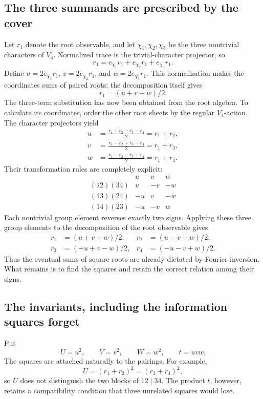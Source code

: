 \documentclass[11pt]{article}
\theoremstyle{remark}
\begin{document}
\subsection{The three summands are prescribed by the cover}

Let \(r_1\) denote the root observable, and let \(\chi_1,\chi_2,\chi_3\) be the three nontrivial characters of \(V_4\). Normalized trace is the trivial-character projector, so
\[
r_1=e_{\chi_1}r_1+e_{\chi_2}r_1+e_{\chi_3}r_1.
\]
Define \(u=2e_{\chi_1}r_1\), \(v=2e_{\chi_2}r_1\), and \(w=2e_{\chi_3}r_1\). This normalization makes the coordinates sums of paired roots; the decomposition itself gives
\[
r_1=(u+v+w)/2.
\]
The three-term substitution has now been obtained from the root algebra. To calculate its coordinates, order the other root sheets by the regular \(V_4\)-action. The character projectors yield
\begin{align}
u&=\frac{r_1+r_2-r_3-r_4}{2}=r_1+r_2,\nonumber\\
v&=\frac{r_1-r_2+r_3-r_4}{2}=r_1+r_3,\label{eq:quartic-fourier}\\
w&=\frac{r_1-r_2-r_3+r_4}{2}=r_1+r_4.\nonumber
\end{align}
Their transformation rules are completely explicit:
\[
\begin{array}{c|ccc}
 &u&v&w\\ \hline
(12)(34)&u&-v&-w\\
(13)(24)&-u&v&-w\\
(14)(23)&-u&-v&w
\end{array}
\]
Each nontrivial group element reverses exactly two signs. Applying these three group elements to the decomposition of the root observable gives
\begin{equation}
\begin{aligned}
r_1&=(u+v+w)/2,&r_2&=(u-v-w)/2,\\
r_3&=(-u+v-w)/2,&r_4&=(-u-v+w)/2.
\end{aligned}
\label{eq:quartic-inversion}
\end{equation}
Thus the eventual sums of square roots are already dictated by Fourier inversion. What remains is to find the squares and retain the correct relation among their signs.

\subsection{The invariants, including the information squares forget}

Put
\[
U=u^2,\qquad V=v^2,\qquad W=w^2,\qquad t=uvw.
\]
The squares are attached naturally to the pairings. For example,
\[
U=(r_1+r_2)^2=(r_3+r_4)^2,
\]
so \(U\) does not distinguish the two blocks of \(12\mid34\). The product \(t\), however, retains a compatibility condition that three unrelated squares would lose.
\end{document}
